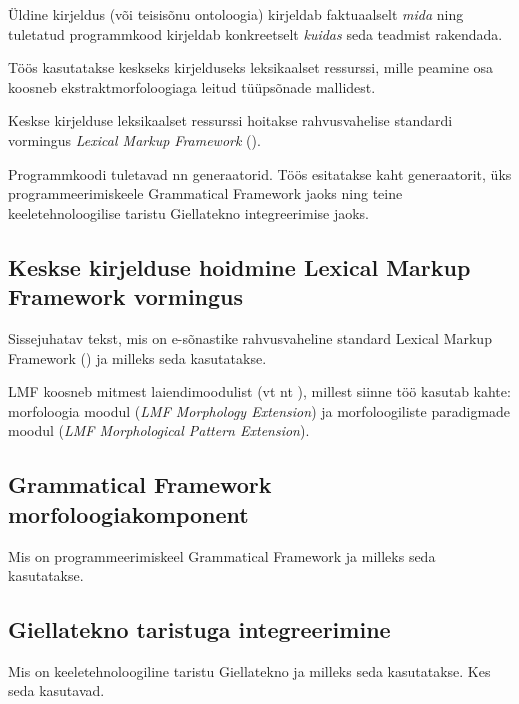 \documentclass[12pt,a4paper]{article}
\begin{document}
Üldine kirjeldus (või teisisõnu ontoloogia) kirjeldab faktuaalselt \textit{mida} ning tuletatud programmkood kirjeldab konkreetselt \textit{kuidas} seda teadmist rakendada.

Töös kasutatakse keskseks kirjelduseks leksikaalset ressurssi, mille peamine osa koosneb ekstraktmorfoloogiaga leitud tüüpsõnade mallidest.

Keskse kirjelduse leksikaalset ressurssi hoitakse rahvusvahelise standardi vormingus \textit{Lexical Markup Framework} (\cite{iso/tc_37/sc_4_language_2007}).

Programmkoodi tuletavad nn generaatorid. Töös esitatakse kaht generaatorit, üks programmeerimiskeele Grammatical Framework jaoks ning teine keeletehnoloogilise taristu Giellatekno integreerimise jaoks.




\subsection{Keskse kirjelduse hoidmine Lexical Markup Framework vormingus}

Sissejuhatav tekst, mis on e-sõnastike rahvusvaheline standard Lexical Markup Framework (\cite{iso/tc_37/sc_4_language_2007}) ja milleks seda kasutatakse.

LMF koosneb mitmest laiendimoodulist (vt nt \cite{francopoulo_lmf_2013}), millest siinne töö kasutab kahte: morfoloogia moodul (\textit{LMF Morphology Extension}) ja morfoloogiliste paradigmade moodul (\textit{LMF Morphological Pattern Extension}).




\subsection{Grammatical Framework morfoloogiakomponent}

Mis on programmeerimiskeel Grammatical Framework ja milleks seda kasutatakse.




\subsection{Giellatekno taristuga integreerimine}

Mis on keeletehnoloogiline taristu Giellatekno ja milleks seda kasutatakse. Kes seda kasutavad.
\end{document}
